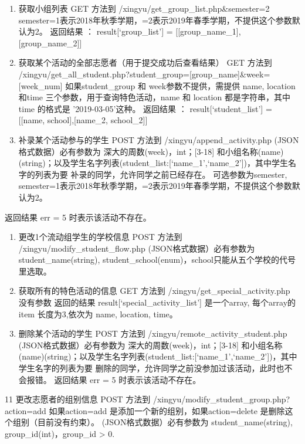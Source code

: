 \documentclass[]{ctexart}
\begin{document}
\begin{enumerate}
\def\labelenumi{\arabic{enumi}.}
\setcounter{enumi}{4}
\item
  获取小组列表 GET 方法到 /xingyu/get\_group\_list.php\&semester=2
  semester=1表示2018年秋季学期，=2表示2019年春季学期，不提供这个参数默认为2。
  返回结果 ： result{[}`group\_list'{]} =
  {[}{[}group\_name\_1{]},{[}group\_name\_2{]}{]}
\item
  获取某个活动的全部志愿者（用于提交成功后查看结果） GET 方法到
  /xingyu/get\_all\_student.php?student\_group={[}group\_name{]}\&week={[}week\_num{]}
  如果student\_group 和 week参数不提供，需提供 name, location 和time
  三个参数，用于查询特色活动，name 和 location 都是字符串，其中 time
  的格式是 '2019-03-05'这种。 返回结果 ： result{[}`student\_list'{]} =
  {[}{[}name, school{]},{[}name\_2, school\_2{]}{]}
\item
  补录某个活动参与的学生 POST 方法到 /xingyu/append\_activity.php
  (JSON格式数据）必有参数为 深大的周数(week)，int；{[}3-18{]}
  和小组名称(name)(string)；以及学生名字列表(student\_list:{[}`name\_1',`name\_2'{]})，其中学生名字的列表为要
  补录的同学，允许同学之前已经存在。 可选参数为semester,
  semester=1表示2018年秋季学期，=2表示2019年春季学期，不提供这个参数默认为2。
\end{enumerate}

返回结果 err = 5 时表示该活动不存在。

\begin{enumerate}
\def\labelenumi{\arabic{enumi}.}
\setcounter{enumi}{7}
\item
  更改1个流动组学生的学校信息 POST 方法到
  /xingyu/modify\_student\_flow.php (JSON格式数据）必有参数为
  student\_name(string),
  student\_school(enum)，school只能从五个学校的代号里选取。
\item
  获取所有的特色活动的信息 GET 方法到 /xingyu/get\_special\_activity.php
  没有参数 返回的结果 result{[}`special\_activity\_list'{]} 是一个array,
  每个array的 item 长度为3,依次为 name, location, time。
\item
  删除某个活动的学生 POST 方法到 /xingyu/remote\_activity\_student.php
  (JSON格式数据）必有参数为 深大的周数(week)，int；{[}3-18{]}
  和小组名称(name)(string)；以及学生名字列表(student\_list:{[}`name\_1',`name\_2'{]})，其中学生名字的列表为要
  删除的同学，允许同学之前没参加过该活动，此时也不会报错。 返回结果 err
  = 5 时表示该活动不存在。
\end{enumerate}

11 更改志愿者的组别信息 POST 方法到
/xingyu/modify\_student\_group.php?action=add 如果action=add
是添加一个新的组别，如果action=delete 是删除这个组别（目前没有约束）。
(JSON格式数据）必有参数为 student\_name(string),
group\_id(int)，group\_id \textgreater{} 0.
\end{document}
